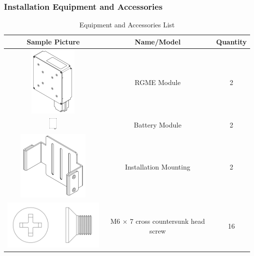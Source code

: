 \documentclass{article}
\begin{document}
\subsubsection{Installation Equipment and Accessories}
\begin{table}[htbp]
    \centering
    \caption{Equipment and Accessories List}
    \begin{tabular}{|c|c|c|}
        \hline
        \toprule
        Sample Picture & Name/Model & Quantity \\
        \midrule
        \includegraphics{RGME module.png}       & RGME Module                                             & 2 \\ \hline
        \includegraphics[width=0.08\textwidth]{Battery module.png}    & Battery Module                     & 2 \\ \hline       
        \includegraphics{Mounting.png}          & Installation Mounting                                   & 2 \\ \hline
        \includegraphics{M6x7.png}              & M6 × 7 cross countersunk head screw                     & 16 \\ \hline

\end{tabular}
\end{table}
\end{document}
